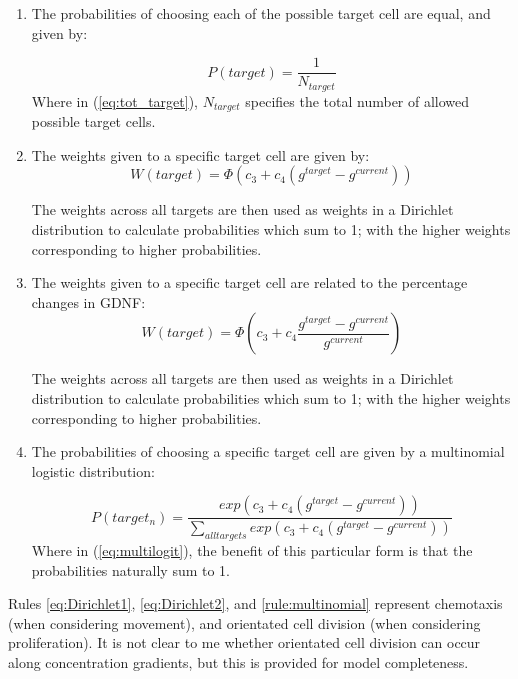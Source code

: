 \documentclass[pdftex,10pt,a4paper]{article}
\begin{document}
\begin{enumerate}
\item The probabilities of choosing each of the possible target cell are equal, and given by:

\begin{equation}\label{eq:tot_target}
P(target) = \frac{1}{N_{target}} 
\end{equation}
Where in (\ref{eq:tot_target}), $N_{target}$ specifies the total number of allowed possible target cells.

\item The weights given to a specific target cell are given by:\label{eq:Dirichlet1}
\begin{equation}
W(target) = \Phi (c_3 + c_4(g^{target} - g^{current}))
\end{equation}

The weights across all targets are then used as weights in a Dirichlet distribution to calculate probabilities which sum to 1; with the higher weights corresponding to higher probabilities.

\item The weights given to a specific target cell are related to the percentage changes in GDNF:\label{eq:Dirichlet2}
\begin{equation}
W(target) = \Phi (c_3 + c_4\frac{g^{target} - g^{current}}{g^{current}})
\end{equation}

The weights across all targets are then used as weights in a Dirichlet distribution to calculate probabilities which sum to 1; with the higher weights corresponding to higher probabilities.

\item The probabilities of choosing a specific target cell are given by a multinomial logistic distribution:\label{rule:multinomial}

\begin{equation} \label{eq:multilogit}
P(target_n) = \frac{exp(c_3 + c_4(g^{target} - g^{current}))}{\sum\limits_{all targets} exp(c_3 + c_4(g^{target} - g^{current}))}
\end{equation}
Where in (\ref{eq:multilogit}), the benefit of this particular form is that the probabilities naturally sum to 1.
\end{enumerate}

Rules \ref{eq:Dirichlet1}, \ref{eq:Dirichlet2}, and \ref{rule:multinomial} represent chemotaxis (when considering movement), and orientated cell division (when considering proliferation). It is not clear to me whether orientated cell division can occur along concentration gradients, but this is provided for model completeness.
\end{document}
